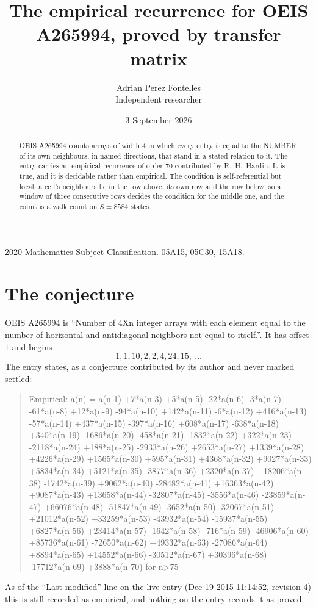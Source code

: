 \documentclass[11pt,a4paper]{article}
\title{The empirical recurrence for OEIS A265994, proved by transfer matrix}
\author{Adrian Perez Fontelles\\ \small Independent researcher}
\date{3 September 2026}
\theoremstyle{plain}
\theoremstyle{definition}
\begin{document}
\maketitle

\begin{abstract}
OEIS A265994 counts arrays of width $4$ in which every entry is equal to the NUMBER of its own
neighbours, in named directions, that stand in a stated relation to it. The entry carries an
empirical recurrence of order $70$ contributed by R.~H.~Hardin. It is true, and it is
decidable rather than empirical. The condition is self-referential but local: a cell's
neighbours lie in the row above, its own row and the row below, so a window of three
consecutive rows decides the condition for the middle one, and the count is a walk count on
$S=8584$ states.
\end{abstract}

\noindent\small 2020 Mathematics Subject Classification. 05A15, 05C30, 15A18.\normalsize

\section{The conjecture}

OEIS A265994 is ``Number of 4Xn integer arrays with each element equal to the number of horizontal and antidiagonal neighbors not equal to itself.''. It has offset $1$ and begins
\[
1, 1, 10, 2, 2, 4, 24, 15,\ \dots
\]
The entry states, as a conjecture contributed by its author and never marked settled:
\begin{quote}
Empirical: a(n) = a(n-1) +7*a(n-3) +5*a(n-5) -22*a(n-6) -3*a(n-7) -61*a(n-8) +12*a(n-9) -94*a(n-10) +142*a(n-11) -6*a(n-12) +416*a(n-13) -57*a(n-14) +437*a(n-15) -397*a(n-16) +608*a(n-17) -638*a(n-18) +340*a(n-19) -1686*a(n-20) -458*a(n-21) -1832*a(n-22) +322*a(n-23) -2118*a(n-24) +188*a(n-25) -2933*a(n-26) +2653*a(n-27) +1339*a(n-28) +4226*a(n-29) +1565*a(n-30) +595*a(n-31) +4368*a(n-32) +9027*a(n-33) +5834*a(n-34) +5121*a(n-35) -3877*a(n-36) +2320*a(n-37) +18206*a(n-38) -1742*a(n-39) +9062*a(n-40) -28482*a(n-41) +16363*a(n-42) +9087*a(n-43) +13658*a(n-44) -32807*a(n-45) -3556*a(n-46) -23859*a(n-47) +66076*a(n-48) -51847*a(n-49) -3652*a(n-50) -32067*a(n-51) +21012*a(n-52) +33259*a(n-53) -43932*a(n-54) -15937*a(n-55) +6827*a(n-56) +23414*a(n-57) -1642*a(n-58) -716*a(n-59) -46906*a(n-60) +85736*a(n-61) -72650*a(n-62) +49332*a(n-63) -27086*a(n-64) +8894*a(n-65) +14552*a(n-66) -30512*a(n-67) +30396*a(n-68) -17712*a(n-69) +3888*a(n-70) for n>75
\end{quote}
As of the ``Last modified'' line on the live entry (Dec 19 2015 11:14:52, revision 4) this is still
recorded as empirical, and nothing on the entry records it as proved.
\end{document}
